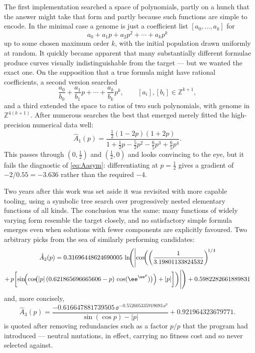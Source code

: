 The first implementation searched a space of polynomials, partly on a hunch that the
answer might take that form and partly because such functions are simple to encode. In
the minimal case a genome is just a coefficient list $[a_0,\dots,a_k]$ for
\begin{equation*}
a_0 + a_1p + a_2p^2 + \cdots + a_kp^k
\end{equation*}
up to some chosen maximum order $k$, with the initial population drawn uniformly at
random. It quickly became apparent that many substantially different formulae produce
curves visually indistinguishable from the target --- but we wanted the exact one. On the
supposition that a true formula might have rational coefficients, a second version
searched
\begin{equation*}
\frac{a_0}{b_0} + \frac{a_1}{b_1}p + \cdots + \frac{a_k}{b_k}p^k,
\qquad [a_i],[b_i]\in\mathbb{Z}^{k+1},
\end{equation*}
and a third extended the space to ratios of two such polynomials, with genome in
$\mathbb{Z}^{4(k+1)}$. After numerous searches the best that emerged merely fitted the
high-precision numerical data well:
\begin{equation}
\label{eq:A1hat}
\hat A_1(p) = \frac{\tfrac12(1-2p)(1+2p)}{1 + \tfrac12 p - \tfrac52 p^2 - \tfrac65 p^3 + \tfrac65 p^4}.
\end{equation}
This passes through $(0,\tfrac12)$ and $(\tfrac12,0)$ and looks convincing to the eye,
but it fails the diagnostic of \cref{eq:Aasym}: differentiating at $p=\tfrac12$ gives a
gradient of $-2/0.55 = -3.636$ rather than the required $-4$.

Two years after this work was set aside it was revisited with more capable tooling,
using a symbolic tree search over progressively nested elementary functions of all
kinds. The conclusion was the same: many functions of widely varying form resemble the
target closely, and no satisfactory simple formula emerges even when solutions with
fewer components are explicitly favoured. Two arbitrary picks from the sea of similarly
performing candidates:
\begin{multline}
\label{eq:A2hat}
\hat A_2(p) = 0.31696448624690005\,
\ln\!\Biggl(\Biggl|\cos\!\biggl(\left(\frac{1}{3.19801133824532}\right)^{\!1/4}\\
+\, p\biggl[\sin\!\Bigl(\cos\!\bigl(|p|\,(0.621865696665606 - p)\,\cos(\ee^{\ee^{p}})\bigr)\Bigr) + |p|\biggr]\biggr)\Biggr|\Biggr)
+ 0.5982282661889831
\end{multline}
and, more concisely,
\begin{equation}
\label{eq:A3hat}
\hat A_3(p) = \frac{-0.616647881739505\,\ee^{-0.552605335919693\,\ee^{p}}}{\sin(\cos p) - |p|} + 0.921964323679771 .
\end{equation}
 is quoted after removing redundancies such as a factor $p/p$ that the
program had introduced --- neutral mutations, in effect, carrying no fitness cost and so
never selected against.


